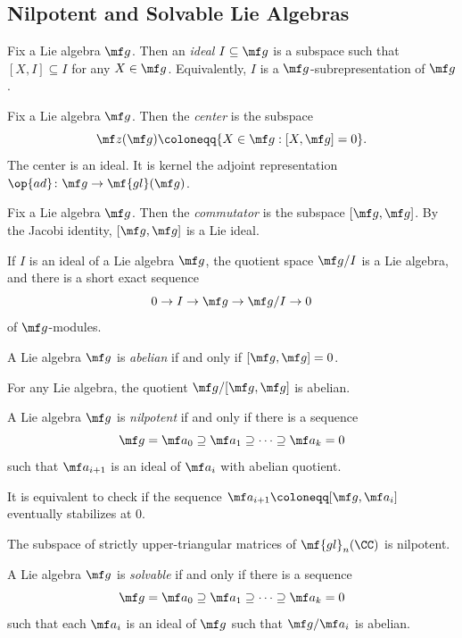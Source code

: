 \documentclass{article}
\begin{document}
\subsection{Nilpotent and Solvable Lie Algebras} \label{subsec:solvable}
\begin{definition}[ideal]
	Fix a Lie algebra $\mf g$. Then an \textit{ideal} $I\subseteq\mf g$ is a subspace such that $[X,I]\subseteq I$ for any $X\in\mf g$. Equivalently, $I$ is a $\mf g$-subrepresentation of $\mf g$.
\end{definition}
\begin{example}[center]
	Fix a Lie algebra $\mf g$. Then the \textit{center} is the subspace
	\[\mf z(\mf g)\coloneqq\{X\in\mf g:[X,\mf g]=0\}.\]
	The center is an ideal. It is kernel the adjoint representation $\op{ad}\colon\mf g\to\mf{gl}(\mf g)$.
\end{example}
\begin{example}[commutator]
	Fix a Lie algebra $\mf g$. Then the \textit{commutator} is the subspace $[\mf g,\mf g]$. By the Jacobi identity, $[\mf g,\mf g]$ is a Lie ideal.
\end{example}
\begin{remark}
	If $I$ is an ideal of a Lie algebra $\mf g$, the quotient space $\mf g/I$ is a Lie algebra, and there is a short exact sequence
	\[0\to I\to\mf g\to\mf g/I\to0\]
	of $\mf g$-modules.
\end{remark}
\begin{definition}
	A Lie algebra $\mf g$ is \textit{abelian} if and only if $[\mf g,\mf g]=0$.
\end{definition}
\begin{example}
	For any Lie algebra, the quotient $\mf g/[\mf g,\mf g]$ is abelian.
\end{example}
\begin{definition}[nilpotent]
	A Lie algebra $\mf g$ is \textit{nilpotent} if and only if there is a sequence
	\[\mf g=\mf a_0\supseteq\mf a_1\supseteq\cdots\supseteq\mf a_k=0\]
	such that $\mf a_{i+1}$ is an ideal of $\mf a_i$ with abelian quotient.
\end{definition}
\begin{remark}
	It is equivalent to check if the sequence $\mf a_{i+1}\coloneqq[\mf g,\mf a_i]$ eventually stabilizes at $0$.
\end{remark}
\begin{example}
	The subspace of strictly upper-triangular matrices of $\mf{gl}_n(\CC)$ is nilpotent.
\end{example}
\begin{definition}[solvable]
	A Lie algebra $\mf g$ is \textit{solvable} if and only if there is a sequence
	\[\mf g=\mf a_0\supseteq\mf a_1\supseteq\cdots\supseteq\mf a_k=0\]
	such that each $\mf a_i$ is an ideal of $\mf g$ such that $\mf g/\mf a_i$ is abelian.
\end{definition}
\end{document}
